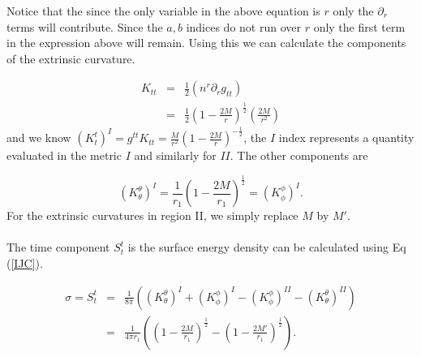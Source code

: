 \documentclass[aps,showpacs,onecolumn,floats,prd,superscriptaddress,nofootinbib]{revtex4-1}
\begin{document}
Notice that the since the only variable in the above equation is $r$ only the $\partial_r$ terms will contribute. Since the $a,b$ indices do not run over $r$ only the first term in the expression above will remain. Using this we can calculate the components of the extrinsic curvature. 

\begin{eqnarray}
	K_{tt} & = & \frac{1}{2} (n^r \partial_r g_{tt}) 	\nonumber	\\
	& = & \frac{1}{2} \left( 1 - \frac{2M}{r} \right)^\frac{1}{2}  \left( \frac{2M}{r^2} \right)
\end{eqnarray}
and we know $(K^t_t)^{I} = g^{tt}K_{tt} = \frac{M}{r^2} \left( 1 - \frac{2M}{r} \right)^{-\frac{1}{2}}$, the $I$ index represents a quantity evaluated in the metric $I$ and similarly for $II$. The other components are 

\begin{equation}
	(K^\theta_\theta)^{I} = \frac{1}{r_1} \left( 1 - \frac{2M}{r_1} \right)^\frac{1}{2} = (K^\phi_\phi)^{I}.
\end{equation}
For the extrinsic curvatures in region II, we simply replace $M$ by $M'$.
\\
\\
The time component $S^t_t$ is the surface energy density can be calculated using Eq (\ref{IJC}).

\begin{eqnarray}
	\sigma = S^t_t & = & \frac{1}{8 \pi} ((K^\theta_\theta)^{I} + (K^\phi_{\phi})^{I} - (K^\phi_\phi)^{II} - (K^\theta_\theta)^{II})	\nonumber	\\
	& = & \frac{1}{4 \pi r_1} \left( \left( 1 - \frac{2M}{r_1} \right)^\frac{1}{2} - \left( 1 - \frac{2M'}{r_1} \right)^\frac{1}{2} \right).
\end{eqnarray}
\end{document}
